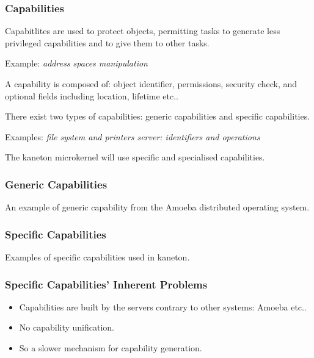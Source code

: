 \begin{frame}
  \frametitle{Capabilities}

  Capabitlites are used to protect objects, permitting tasks to generate
  less privileged capabilities and to give them to other tasks.

  \nl

  Example: \textit{address spaces manipulation}

  \nl

  A capability is composed of: object identifier, permissions,
  security check, and optional fields including location, lifetime
  etc..

  \nl

  There exist two types of capabilities: generic capabilities and
  \alert{specific} capabilities.

  \nl

  Examples: \textit{file system and printers server: identifiers
    and operations}

  \nl

  The kaneton microkernel will use specific and specialised capabilities.
\end{frame}


\begin{frame}
  \frametitle{Generic Capabilities}

  An example of generic capability from the Amoeba distributed operating
  system.

  \nl

  \begin{center}
  \end{center}
\end{frame}


\begin{frame}
  \frametitle{Specific Capabilities}

  Examples of specific capabilities used in kaneton.

  \begin{center}
  \end{center}
\end{frame}


\begin{frame}
  \frametitle{Specific Capabilities' Inherent Problems}

  \begin{itemize}[<+->]
    \item
      Capabilities are built by the servers contrary to other systems:
      Amoeba etc..
    \item
      No capability unification.
    \item
      So a slower mechanism for capability generation.
  \end{itemize}
\end{frame}


